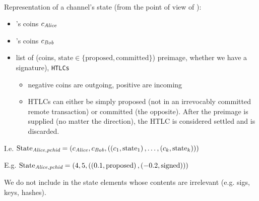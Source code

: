   \ \\

  Representation of a channel's state (from the point of view of \alice):
  \begin{itemize}
    \item \alice's coins $c_{\mathit{Alice}}$
    \item \bob's coins $c_{\mathit{Bob}}$
    \item list of (coins, $\mathrm{state} \in \{\mathrm{proposed},
    \mathrm{committed}\}$) preimage, whether we have a signature),
    \texttt{HTLCs}
    \begin{itemize}
      \item negative coins are outgoing, positive are incoming
      \item HTLCs can either be simply proposed (not in an irrevocably committed
      remote transaction) or committed (the opposite). After the preimage is
      supplied (no matter the direction), the HTLC is considered settled and is
      discarded.
    \end{itemize}
  \end{itemize}

  I.e. $\mathrm{State}_{\mathit{Alice}, \textit{pchid}} = \left(c_{\mathit{Alice}}, c_{\mathit{Bob}},
  \left(\left(c_1, \mathrm{state}_1\right), \dots, \left(c_k,
  \mathrm{state}_k\right)\right)\right)$

  E.g. $\mathrm{State}_{\mathit{Alice}, \textit{pchid}} = \left(4, 5, \left(\left(0.1,
  \mathrm{proposed}\right), \left(-0.2, \mathrm{signed}\right)\right)\right)$

  We do not include in the state elements whose contents are irrelevant (e.g.
  sigs, keys, hashes).
